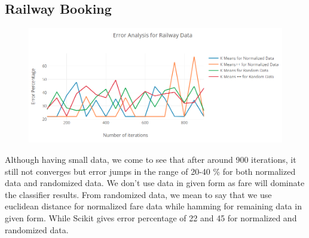 \documentclass[conference]{IEEEtran}
\begin{document}
\subsection{Railway Booking}
\begin{figure}[htbp]
\centerline{\includegraphics{Capture.PNG}}
\label{fig}
\end{figure}
Although having small data, we come to see that after around 900 iterations, it still not converges but error jumps in the range of 20-40 \% for both normalized data and randomized data. We don't use data in given form as fare will dominate the classifier results. From randomized data, we mean to say that we use euclidean distance for normalized fare data while hamming for remaining data in given form. While Scikit gives error percentage of 22 and 45 for normalized and randomized data.
\end{document}
